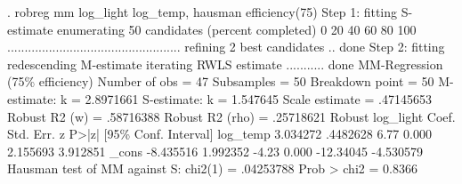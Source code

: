 . robreg mm log_light log_temp, hausman efficiency(75)
{\smallskip}
Step 1: fitting S-estimate
{\smallskip}
enumerating 50 candidates (percent completed)
0  20  40  60  80  100
..................................................
{\smallskip}
refining 2 best candidates .. done
{\smallskip}
Step 2: fitting redescending M-estimate
{\smallskip}
iterating RWLS estimate ........... done
{\smallskip}
MM-Regression (75\% efficiency)                  Number of obs     =         47
                                                  Subsamples      =         50
                                                  Breakdown point =         50
                                                  M-estimate: k   =  2.8971661
                                                  S-estimate: k   =   1.547645
                                                  Scale estimate  =  .47145653
                                                  Robust R2 (w)   =  .58716388
                                                  Robust R2 (rho) =  .25718621
{\smallskip}
             {\VBAR}               Robust
   log_light {\VBAR}      Coef.   Std. Err.      z    P>|z|     [95\% Conf. Interval]
    log_temp {\VBAR}   3.034272   .4482628     6.77   0.000     2.155693    3.912851
       _cons {\VBAR}  -8.435516   1.992352    -4.23   0.000    -12.34045   -4.530579
Hausman test of MM against S:    chi2(1) = .04253788      Prob > chi2 = 0.8366
{\smallskip}
